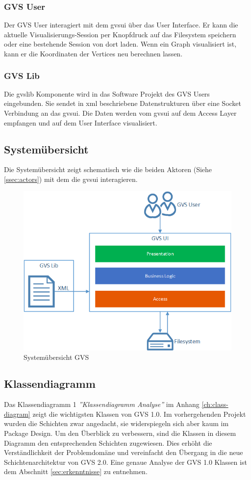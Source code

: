 \documentclass[11pt,a4paper,english,oneside]{book}
\numberwithin{equation}{chapter}
\begin{document}
	\subsubsection{GVS User} \label{sssec:actor-user}
	Der GVS User interagiert mit dem \gls{gvsui} über das User Interface. Er kann die aktuelle Visualisierungs-Session per Knopfdruck auf das Filesystem speichern oder eine bestehende Session von dort laden. Wenn ein Graph visualisiert ist, kann er die Koordinaten der Vertices neu berechnen lassen.
	
	\subsubsection{GVS Lib} \label{sssec:actor-lib}
	Die \gls{gvslib} Komponente wird in das Software Projekt des GVS Users eingebunden. Sie sendet in \gls{xml} beschriebene Datenstrukturen über eine Socket Verbindung an das \gls{gvsui}. Die Daten werden vom \gls{gvsui} auf dem Access Layer empfangen und auf dem User Interface visualisiert.
	
	\subsection{Systemübersicht}
	Die Systemübersicht zeigt schematisch wie die beiden Aktoren (Siehe \ref{ssec:actors}) mit dem  die \gls{gvsui} interagieren.
	
	\begin{figure}[h!]
		\centering
		\includegraphics[width=0.5\linewidth]{assets/images/system_overview}
		\caption{Systemübersicht GVS}
		\label{fig:gvs-systemuebersicht}
	\end{figure}
	
	\subsection{Klassendiagramm} \label{ssec:klassendiagramm-1}
	Das Klassendiagramm 1 \textit{''Klassendiagramm Analyse''} im Anhang \ref{ch:class-diagram} zeigt die wichtigsten Klassen von GVS 1.0. Im vorhergehenden Projekt wurden die Schichten zwar angedacht, sie widerspiegeln sich aber kaum im Package Design. Um den Überblick zu verbessern, sind die Klassen in diesem Diagramm den entsprechenden Schichten zugewiesen. Dies erhöht die Verständlichkeit der Problemdomäne und vereinfacht den Übergang in die neue Schichtenarchitektur von GVS 2.0. Eine genaue Analyse der GVS 1.0 Klassen ist dem Abschnitt \ref{sec:erkenntnisse} zu entnehmen. 
		
\end{document}
